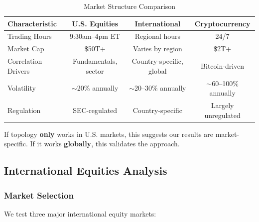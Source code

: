 \begin{table}[H]
\centering
\caption{Market Structure Comparison}
\label{tab:market-structure}
\begin{tabular}{@{}lccc@{}}
\toprule
\textbf{Characteristic} & \textbf{U.S. Equities} & \textbf{International} & \textbf{Cryptocurrency} \\
\midrule
Trading Hours & 9:30am--4pm ET & Regional hours & 24/7 \\
Market Cap & \$50T+ & Varies by region & \$2T+ \\
Correlation Drivers & Fundamentals, sector & Country-specific, global & Bitcoin-driven \\
Volatility & $\sim$20\% annually & $\sim$20--30\% annually & $\sim$60--100\% annually \\
Regulation & SEC-regulated & Country-specific & Largely unregulated \\
\bottomrule
\end{tabular}
\end{table}

If topology \textbf{only} works in U.S. markets, this suggests our results are market-specific. If it works \textbf{globally}, this validates the approach.

\subsection{International Equities Analysis}

\subsubsection{Market Selection}

We test three major international equity markets:

